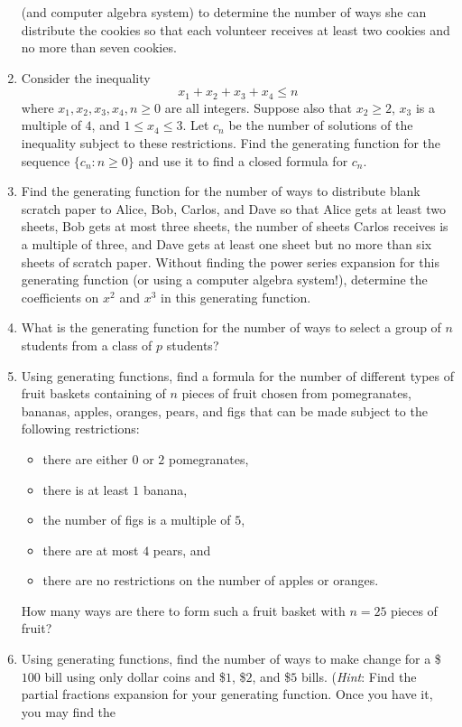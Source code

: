 \begin{enumerate}
   (and computer algebra system) to determine the number of ways she
   can distribute the cookies so that each volunteer receives at least
   two cookies and no more than seven cookies.
 \item Consider the inequality
   \[x_1+x_2+x_3+x_4\leq n\] where $x_1,x_2,x_3,x_4,n\geq 0$ are all
   integers. Suppose also that $x_2\geq 2$, $x_3$ is a multiple of
   $4$, and $1\leq x_4\leq 3$. Let $c_n$ be the number of solutions of
   the inequality subject to these restrictions. Find the generating
   function for the sequence $\{c_n\colon n\geq 0\}$ and use it to
   find a closed formula for $c_n$.
 \item Find the generating function for the number of ways to
   distribute blank scratch paper to Alice, Bob, Carlos, and Dave so
   that Alice gets at least two sheets, Bob gets at most three sheets,
   the number of sheets Carlos receives is a multiple of three, and
   Dave gets at least one sheet but no more than six sheets of scratch
   paper. Without finding the power series expansion for this
   generating function (or using a computer algebra system!),
   determine the coefficients on $x^2$ and $x^3$ in this generating
   function.
 \item What is the generating function for the number of ways
   to select a group of $n$ students from a class of $p$ students?
 \item Using generating functions, find a formula for the
   number of different types of fruit baskets containing of $n$ pieces
   of fruit chosen from pomegranates, bananas, apples, oranges, pears,
   and figs that can be made subject to the following restrictions:
  \begin{itemize}
  \item there are either $0$ or $2$ pomegranates,
  \item there is at least $1$ banana,
  \item the number of figs is a multiple of $5$,
  \item there are at most $4$ pears, and
  \item there are no restrictions on the number of apples or oranges.
  \end{itemize}
  How many ways are there to form such a fruit basket with $n=25$ pieces of
  fruit?
\item Using generating functions, find the number of ways to make
  change for a \$$100$ bill using only dollar coins and \$$1$, \$$2$,
  and \$$5$ bills. (\emph{Hint}: Find the partial fractions expansion
  for your generating function. Once you have it, you may find the

\end{enumerate}
